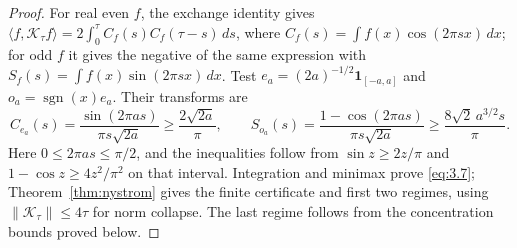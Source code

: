 \begin{proof}
For real even $f$, the exchange identity gives
$\langle f,\mathcal K_\tau f\rangle
=2\int_0^\tau C_f(s)C_f(\tau-s)\,ds$, where
$C_f(s)=\int f(x)\cos(2\pi sx)\,dx$; for odd $f$ it gives the negative
of the same expression with $S_f(s)=\int f(x)\sin(2\pi sx)\,dx$.
Test $e_a=(2a)^{-1/2}\mathbf1_{[-a,a]}$ and
$o_a=\operatorname{sgn}(x)e_a$. Their transforms are
\[
 C_{e_a}(s)=\frac{\sin(2\pi as)}{\pi s\sqrt{2a}}
 \ge\frac{2\sqrt{2a}}\pi,\qquad
 S_{o_a}(s)=\frac{1-\cos(2\pi as)}{\pi s\sqrt{2a}}
 \ge\frac{8\sqrt2\,a^{3/2}s}\pi .
\]
Here $0\le2\pi as\le\pi/2$, and the inequalities follow from
$\sin z\ge2z/\pi$ and $1-\cos z\ge4z^2/\pi^2$ on that interval.
Integration and minimax prove \eqref{eq:3.7}; Theorem~\ref{thm:nystrom}
gives the finite certificate and first two regimes, using
$\|\mathcal K_\tau\|\le4\tau$ for norm collapse. The last regime
follows from the concentration bounds proved below.


\end{proof}
